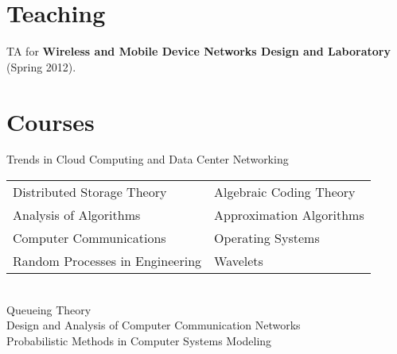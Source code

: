 \documentclass[margin,line]{resume}
\begin{document}
\begin{resume}


\section{\mysidestyle Teaching}
TA for \textbf{Wireless and Mobile Device Networks Design and Laboratory} (Spring 2012).
\newpage
\section{\mysidestyle Courses} 

Trends in Cloud Computing and Data Center Networking\\
\begin{tabular}{@{}p{7cm}p{7cm}}
Distributed Storage Theory & Algebraic Coding Theory \\
Analysis of Algorithms  &  Approximation Algorithms                   \\
Computer Communications  & Operating Systems \\
Random Processes in Engineering  & Wavelets \\
\end{tabular} \\
Queueing Theory \\
Design and Analysis of Computer Communication Networks \\
Probabilistic Methods in Computer Systems Modeling





    

\end{resume}
\end{document}
